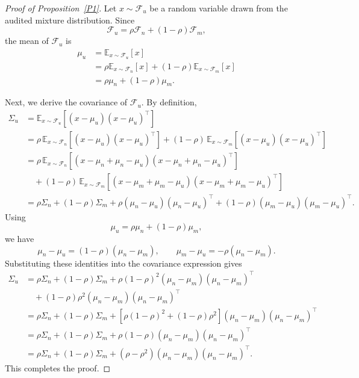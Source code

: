 \documentclass{article}
\theoremstyle{plain}
\theoremstyle{definition}
\theoremstyle{remark}
\begin{document}
\begin{proof}[Proof of Proposition~\ref{P1}]
Let $x\sim\mathcal F_u$ be a random variable drawn from the audited mixture distribution. Since
\begin{equation}
\mathcal F_u=\rho\mathcal F_n+(1-\rho)\mathcal F_m,
\end{equation}
the mean of $\mathcal F_u$ is
\begin{align}
\mu_u
&=
\mathbb E_{x\sim\mathcal F_u}[x] \nonumber\\
&=
\rho \mathbb E_{x\sim\mathcal F_n}[x]
+
(1-\rho)\mathbb E_{x\sim\mathcal F_m}[x] \nonumber\\
&=
\rho\mu_n+(1-\rho)\mu_m .
\end{align}

Next, we derive the covariance of $\mathcal F_u$. By definition,
\begin{align}
\Sigma_u
&=
\mathbb E_{x\sim\mathcal F_u}
\left[
(x-\mu_u)(x-\mu_u)^\top
\right] \nonumber\\
&=
\rho\,
\mathbb E_{x\sim\mathcal F_n}
\left[
(x-\mu_u)(x-\mu_u)^\top
\right]
+
(1-\rho)\,
\mathbb E_{x\sim\mathcal F_m}
\left[
(x-\mu_u)(x-\mu_u)^\top
\right] \nonumber\\
&=
\rho\,
\mathbb E_{x\sim\mathcal F_n}
\left[
(x-\mu_n+\mu_n-\mu_u)
(x-\mu_n+\mu_n-\mu_u)^\top
\right] \nonumber\\
&\quad
+
(1-\rho)\,
\mathbb E_{x\sim\mathcal F_m}
\left[
(x-\mu_m+\mu_m-\mu_u)
(x-\mu_m+\mu_m-\mu_u)^\top
\right] \nonumber\\
&=
\rho\Sigma_n
+
(1-\rho)\Sigma_m
+
\rho(\mu_n-\mu_u)(\mu_n-\mu_u)^\top
+
(1-\rho)(\mu_m-\mu_u)(\mu_m-\mu_u)^\top .
\end{align}
Using
\begin{equation}
\mu_u=\rho\mu_n+(1-\rho)\mu_m,
\end{equation}
we have
\begin{equation}
\mu_n-\mu_u
=
(1-\rho)(\mu_n-\mu_m),
\qquad
\mu_m-\mu_u
=
-\rho(\mu_n-\mu_m).
\end{equation}
Substituting these identities into the covariance expression gives
\begin{align}
\Sigma_u
&=
\rho\Sigma_n
+
(1-\rho)\Sigma_m
+
\rho(1-\rho)^2
(\mu_n-\mu_m)(\mu_n-\mu_m)^\top \nonumber\\
&\quad
+
(1-\rho)\rho^2
(\mu_n-\mu_m)(\mu_n-\mu_m)^\top \nonumber\\
&=
\rho\Sigma_n
+
(1-\rho)\Sigma_m
+
\left[
\rho(1-\rho)^2+(1-\rho)\rho^2
\right]
(\mu_n-\mu_m)(\mu_n-\mu_m)^\top \nonumber\\
&=
\rho\Sigma_n
+
(1-\rho)\Sigma_m
+
\rho(1-\rho)
(\mu_n-\mu_m)(\mu_n-\mu_m)^\top \nonumber\\
&=
\rho\Sigma_n
+
(1-\rho)\Sigma_m
+
(\rho-\rho^2)
(\mu_n-\mu_m)(\mu_n-\mu_m)^\top .
\end{align}
This completes the proof.
\end{proof}
\end{document}
